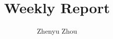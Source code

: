 \documentclass[a4paper,12pt]{article}
\begin{document}
\title{Weekly Report}
\author{Zhenyu Zhou}
\maketitle


% 
\end{document}
